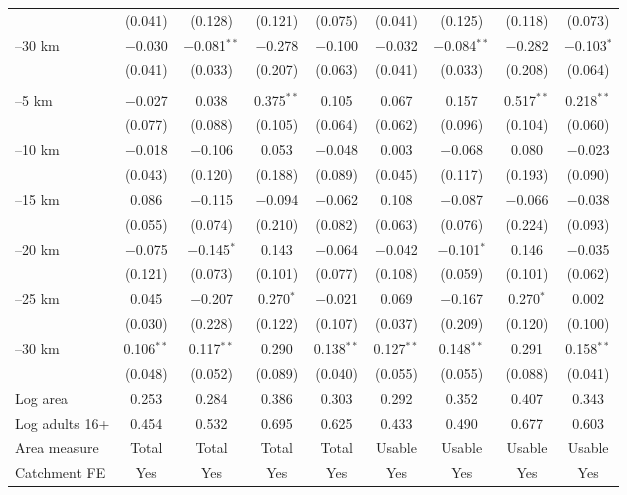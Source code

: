 \documentclass[11pt]{article}
\begin{document}
\begin{table}[H]
\begin{adjustbox}{max width=\textwidth, max totalheight=0.8\textheight}
\begin{tabular}{lcccccccc}
 & (0.041) & (0.128) & (0.121) & (0.075) & (0.041) & (0.125) & (0.118) & (0.073) \\
\quad 25--30 km & $-$0.030 & $-$0.081$^{**}$ & $-$0.278 & $-$0.100 & $-$0.032 & $-$0.084$^{**}$ & $-$0.282 & $-$0.103$^{*}$ \\
 & (0.041) & (0.033) & (0.207) & (0.063) & (0.041) & (0.033) & (0.208) & (0.064) \\
\addlinespace
\multicolumn{9}{l}{\textit{Catchment: Volcanoes}} \\
\quad 0--5 km & $-$0.027 & 0.038 & 0.375$^{**}$ & 0.105 & 0.067 & 0.157 & 0.517$^{**}$ & 0.218$^{**}$ \\
 & (0.077) & (0.088) & (0.105) & (0.064) & (0.062) & (0.096) & (0.104) & (0.060) \\
\quad 5--10 km & $-$0.018 & $-$0.106 & 0.053 & $-$0.048 & 0.003 & $-$0.068 & 0.080 & $-$0.023 \\
 & (0.043) & (0.120) & (0.188) & (0.089) & (0.045) & (0.117) & (0.193) & (0.090) \\
\quad 10--15 km & 0.086 & $-$0.115 & $-$0.094 & $-$0.062 & 0.108 & $-$0.087 & $-$0.066 & $-$0.038 \\
 & (0.055) & (0.074) & (0.210) & (0.082) & (0.063) & (0.076) & (0.224) & (0.093) \\
\quad 15--20 km & $-$0.075 & $-$0.145$^{*}$ & 0.143 & $-$0.064 & $-$0.042 & $-$0.101$^{*}$ & 0.146 & $-$0.035 \\
 & (0.121) & (0.073) & (0.101) & (0.077) & (0.108) & (0.059) & (0.101) & (0.062) \\
\quad 20--25 km & 0.045 & $-$0.207 & 0.270$^{*}$ & $-$0.021 & 0.069 & $-$0.167 & 0.270$^{*}$ & 0.002 \\
 & (0.030) & (0.228) & (0.122) & (0.107) & (0.037) & (0.209) & (0.120) & (0.100) \\
\quad 25--30 km & 0.106$^{**}$ & 0.117$^{**}$ & 0.290 & 0.138$^{**}$ & 0.127$^{**}$ & 0.148$^{**}$ & 0.291 & 0.158$^{**}$ \\
 & (0.048) & (0.052) & (0.089) & (0.040) & (0.055) & (0.055) & (0.088) & (0.041) \\
\addlinespace
\midrule
Log area & 0.253 & 0.284 & 0.386 & 0.303 & 0.292 & 0.352 & 0.407 & 0.343 \\
Log adults 16+ & 0.454 & 0.532 & 0.695 & 0.625 & 0.433 & 0.490 & 0.677 & 0.603 \\
Area measure & Total & Total & Total & Total & Usable & Usable & Usable & Usable \\
Catchment FE & Yes & Yes & Yes & Yes & Yes & Yes & Yes & Yes \\

\end{tabular}
\end{adjustbox}
\end{table}
\end{document}
